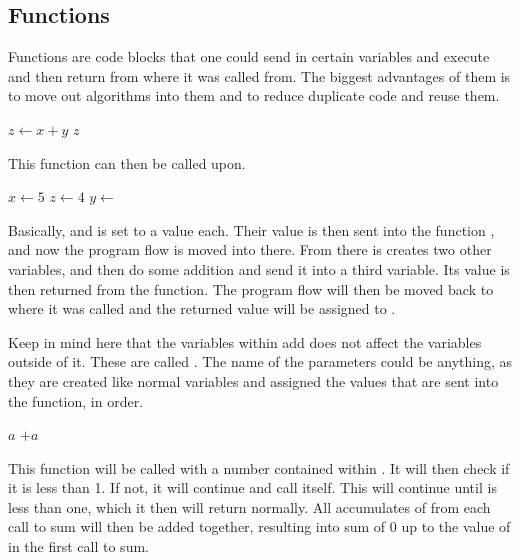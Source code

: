 \subsection{Functions}

Functions are code blocks that one could send in certain variables and execute and then return from where it was called from. The biggest advantages of them is to move out algorithms into them and to reduce duplicate code and reuse them.

\begin{algorithm}[H]
	\begin{algorithmic}[1]
			\State $z \gets x + y$
			\Return $z$
		\EndFunction
	\end{algorithmic}
\end{algorithm}

This function can then be called upon.

\begin{algorithm}[H]
	\begin{algorithmic}[1]
		\State $x \gets 5$
		\State $z \gets 4$
		\State $y \gets$ 
	\end{algorithmic}
\end{algorithm}

Basically,  and  is set to a value each. Their value is then sent into the function , and now the program flow is moved into there. From there is creates two other variables, and then do some addition and send it into a third variable. Its value is then returned from the function. The program flow will then be moved back to where it was called and the returned value will be assigned to .

Keep in mind here that the variables within add does not affect the variables outside of it. These are called . The name of the parameters could be anything, as they are created like normal variables and assigned the values that are sent into the function, in order.

\begin{algorithm}[H]
	\begin{algorithmic}[1]
				\Return $a$
			\EndIf
			\Return {}$ + a$
		\EndFunction
	\end{algorithmic}
\end{algorithm}

This function will be called with a number contained within . It will then check if it is less than 1. If not, it will continue and call itself. This will continue until  is less than one, which it then will return normally. All accumulates of  from each call to sum will then be added together, resulting into  sum of 0 up to the value of  in the first call to sum.

